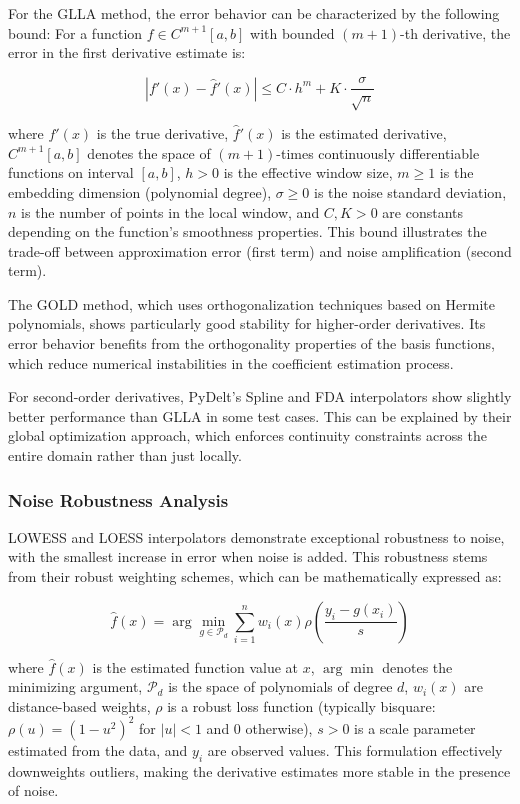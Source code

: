 \documentclass[10pt,journal,compsoc]{IEEEtran}
\begin{document}
For the GLLA method, the error behavior can be characterized by the following bound: For a function $f \in C^{m+1}[a,b]$ with bounded $(m+1)$-th derivative, the error in the first derivative estimate is:

\begin{equation}
    |f'(x) - \hat{f}'(x)| \leq C \cdot h^m + K \cdot \frac{\sigma}{\sqrt{n}}
\end{equation}

where $f'(x)$ is the true derivative, $\hat{f}'(x)$ is the estimated derivative, $C^{m+1}[a,b]$ denotes the space of $(m+1)$-times continuously differentiable functions on interval $[a,b]$, $h > 0$ is the effective window size, $m \geq 1$ is the embedding dimension (polynomial degree), $\sigma \geq 0$ is the noise standard deviation, $n$ is the number of points in the local window, and $C, K > 0$ are constants depending on the function's smoothness properties. This bound illustrates the trade-off between approximation error (first term) and noise amplification (second term).

The GOLD method, which uses orthogonalization techniques based on Hermite polynomials, shows particularly good stability for higher-order derivatives. Its error behavior benefits from the orthogonality properties of the basis functions, which reduce numerical instabilities in the coefficient estimation process.

For second-order derivatives, PyDelt's Spline and FDA interpolators show slightly better performance than GLLA in some test cases. This can be explained by their global optimization approach, which enforces continuity constraints across the entire domain rather than just locally.

\subsubsection{Noise Robustness Analysis}

LOWESS and LOESS interpolators demonstrate exceptional robustness to noise, with the smallest increase in error when noise is added. This robustness stems from their robust weighting schemes, which can be mathematically expressed as:

\begin{equation}
    \hat{f}(x) = \arg\min_{g \in \mathcal{P}_d} \sum_{i=1}^{n} w_i(x) \rho\left(\frac{y_i - g(x_i)}{s}\right)
\end{equation}

where $\hat{f}(x)$ is the estimated function value at $x$, $\arg\min$ denotes the minimizing argument, $\mathcal{P}_d$ is the space of polynomials of degree $d$, $w_i(x)$ are distance-based weights, $\rho$ is a robust loss function (typically bisquare: $\rho(u) = (1-u^2)^2$ for $|u| < 1$ and 0 otherwise), $s > 0$ is a scale parameter estimated from the data, and $y_i$ are observed values. This formulation effectively downweights outliers, making the derivative estimates more stable in the presence of noise.
\end{document}
